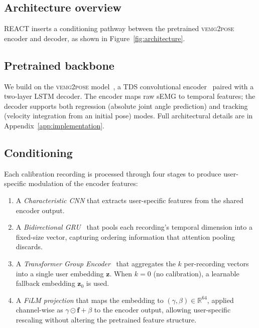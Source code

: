\documentclass[conference]{IEEEtran}
\begin{document}
\subsection{Architecture overview}
\label{sec:architecture}

REACT inserts a conditioning pathway between the pretrained \textsc{vemg2pose} encoder and decoder, as shown in Figure~\ref{fig:architecture}.

\subsection{Pretrained backbone}
\label{sec:backbone}

We build on the \textsc{vemg2pose} model~\cite{salter2024emg2pose}, a TDS convolutional encoder~\cite{hannun2019sequence} paired with a two-layer LSTM decoder. The encoder maps raw sEMG to temporal features; the decoder supports both regression (absolute joint angle prediction) and tracking (velocity integration from an initial pose) modes. Full architectural details are in Appendix~\ref{app:implementation}.

\subsection{Conditioning}
\label{sec:conditioning}

Each calibration recording is processed through four stages to produce user-specific modulation of the encoder features:

\begin{enumerate}[leftmargin=*,itemsep=2pt,topsep=2pt]
    \item A \emph{Characteristic CNN} that extracts user-specific features from the shared encoder output.
    \item A \emph{Bidirectional GRU}~\cite{cho2014gru} that pools each recording's temporal dimension into a fixed-size vector, capturing ordering information that attention pooling discards.
    \item A \emph{Transformer Group Encoder}~\cite{lee2019set} that aggregates the $k$ per-recording vectors into a single user embedding $\mathbf{z}$. When $k{=}0$ (no calibration), a learnable fallback embedding $\mathbf{z}_0$ is used.
    \item A \emph{FiLM projection} that maps the embedding to $(\gamma, \beta) \in \mathbb{R}^{64}$, applied channel-wise as $\gamma \odot \mathbf{f} + \beta$ to the encoder output, allowing user-specific rescaling without altering the pretrained feature structure.
\end{enumerate}
\end{document}
